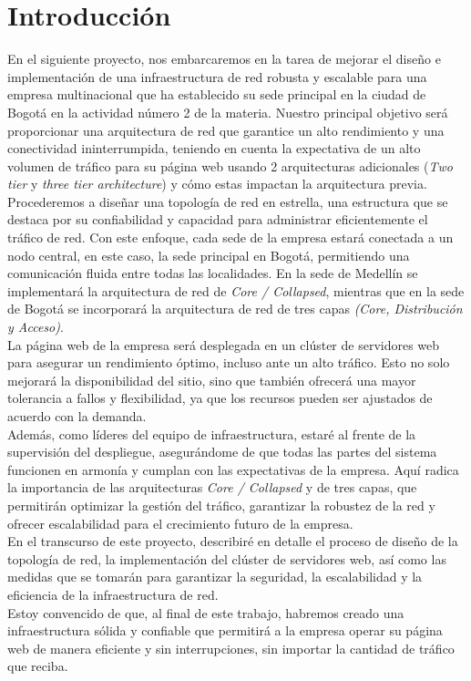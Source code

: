 \section{Introducción}

En el siguiente proyecto, nos embarcaremos en la tarea de mejorar el diseño e
implementación de una infraestructura de red robusta y escalable para una empresa multinacional
que ha establecido su sede principal en la ciudad de Bogotá en la actividad
número 2 de la materia. Nuestro principal
objetivo será proporcionar una arquitectura de red que garantice un alto
rendimiento y una conectividad ininterrumpida, teniendo en cuenta la
expectativa de un alto volumen de tráfico para su página web usando 2
arquitecturas adicionales (\textit{Two tier} y \textit{three tier architecture})
y cómo estas impactan la arquitectura previa.
\\

Procederemos a diseñar una topología de red en estrella, una estructura que se
destaca por su confiabilidad y capacidad para administrar eficientemente el
tráfico de red. Con este enfoque, cada sede de la empresa estará conectada a un
nodo central, en este caso, la sede principal en Bogotá, permitiendo una
comunicación fluida entre todas las localidades.
En la sede de Medellín se implementará la arquitectura de red de
\textit{Core / Collapsed}, mientras que en la sede de Bogotá se incorporará la
arquitectura de red de tres capas \textit{(Core, Distribución y Acceso)}.
\\

La página web de la empresa será desplegada en un clúster de servidores web
para asegurar un rendimiento óptimo, incluso ante un alto tráfico. Esto no
solo mejorará la disponibilidad del sitio, sino que también ofrecerá una mayor
tolerancia a fallos y flexibilidad, ya que los recursos pueden ser ajustados de
acuerdo con la demanda.
\\

Además, como líderes del equipo de infraestructura, estaré al frente de la
supervisión del despliegue, asegurándome de que todas las partes del sistema
funcionen en armonía y cumplan con las expectativas de la empresa.
Aquí radica la importancia de las arquitecturas \textit{Core / Collapsed} y de
tres capas, que permitirán optimizar la gestión del tráfico, garantizar la
robustez de la red y ofrecer escalabilidad para el crecimiento futuro de la
empresa.
\\

En el transcurso de este proyecto, describiré en detalle el proceso de diseño
de la topología de red, la implementación del clúster de servidores web, así
como las medidas que se tomarán para garantizar la seguridad, la escalabilidad
y la eficiencia de la infraestructura de red.
\\

Estoy convencido de que, al final de este trabajo, habremos creado una
infraestructura sólida y confiable que permitirá a la empresa operar su página
web de manera eficiente y sin interrupciones, sin importar la cantidad de
tráfico que reciba.
